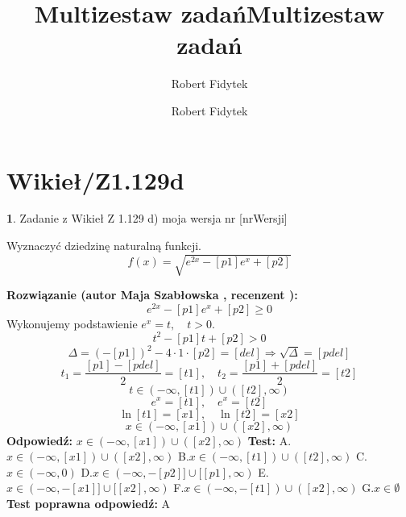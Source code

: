 \documentclass[12pt, a4paper]{article}
\title{Multizestaw zadań}
\author{Robert Fidytek}
\date{}\documentclass[12pt, a4paper]{article}
\title{Multizestaw zadań}
\author{Robert Fidytek}
\date{}
\theoremstyle{definition} %
\newtheorem{zad}{}
\theoremstyle{definition} %
\newtheorem{zad}{}
\newcommand{\kategoria}[1]{\section{#1}} %
\newcommand{\zadStart}[1]{\begin{zad}#1\newline} %
\newcommand{\zadStop}{\end{zad}}   %
\newcommand{\rozwStart}[2]{\noindent \textbf{Rozwiązanie (autor #1 , recenzent #2): }\newline} %
\newcommand{\rozwStop}{\newline}                                            %
\newcommand{\odpStart}{\noindent \textbf{Odpowiedź:}\newline}    %
\newcommand{\odpStop}{\newline}                                             %
\newcommand{\testStart}{\noindent \textbf{Test:}\newline} %
\newcommand{\testStop}{\newline} %
\newcommand{\kluczStart}{\noindent \textbf{Test poprawna odpowiedź:}\newline} %
\newcommand{\kluczStop}{\newline} %
\begin{document}
\maketitle


\kategoria{Wikieł/Z1.129d}
\zadStart{Zadanie z Wikieł Z 1.129 d) moja wersja nr [nrWersji]}

Wyznaczyć dziedzinę naturalną funkcji.
$$f(x)=\sqrt{e^{2x}-[p1]e^{x}+[p2]}$$

\zadStop

\rozwStart{Maja Szabłowska}{}
$$e^{2x}-[p1]e^{x}+[p2]\geq 0$$
Wykonujemy podstawienie $e^{x}=t,\quad t>0.$
$$t^{2}-[p1]t+[p2]>0$$
$$\Delta=(-[p1])^{2}-4\cdot1\cdot[p2]=[del] \Rightarrow \sqrt{\Delta}=[pdel]$$
$$t_{1}=\frac{[p1]-[pdel]}{2}=[t1], \quad t_{2}=\frac{[p1]+[pdel]}{2}=[t2]$$
$$t\in(-\infty,[t1])\cup([t2],\infty)$$
$$e^{x}=[t1], \quad e^{x}=[t2]$$
$$\ln[t1]=[x1], \quad \ln[t2]=[x2]$$
$$x\in(-\infty,[x1])\cup([x2],\infty)$$
\rozwStop
\odpStart
$x\in(-\infty,[x1])\cup([x2],\infty)$
\odpStop
\testStart
A.$x\in(-\infty,[x1])\cup([x2],\infty)$
B.$x\in(-\infty,[t1])\cup([t2],\infty)$
C.$x\in(-\infty, 0)$
D.$x\in(-\infty, -[p2]] \cup [[p1],\infty)$
E.$x\in(-\infty, -[x1]] \cup [[x2],\infty)$
F.$x\in(-\infty, -[t1]) \cup ([x2],\infty)$
G.$x\in\emptyset$
\testStop
\kluczStart
A
\kluczStop
\end{document}
